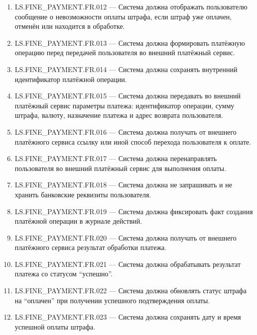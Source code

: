 \documentclass[12pt,a4paper]{article}
\begin{document}
\begin{enumerate}
		\item LS.FINE\_PAYMENT.FR.012 --- Система должна отображать пользователю сообщение о
		невозможности оплаты штрафа, если штраф уже оплачен, отменён или находится
		в обработке.
		
		\item LS.FINE\_PAYMENT.FR.013 --- Система должна формировать платёжную операцию перед
		передачей пользователя во внешний платёжный сервис.
		
		\item LS.FINE\_PAYMENT.FR.014 --- Система должна сохранять внутренний идентификатор
		платёжной операции.
		
		\item LS.FINE\_PAYMENT.FR.015 --- Система должна передавать во внешний платёжный сервис
		параметры платежа: идентификатор операции, сумму штрафа, валюту, назначение
		платежа и адрес возврата пользователя.
		
		\item LS.FINE\_PAYMENT.FR.016 --- Система должна получать от внешнего платёжного сервиса
		ссылку или иной способ перехода пользователя к оплате.
		
		\item LS.FINE\_PAYMENT.FR.017 --- Система должна перенаправлять пользователя во внешний
		платёжный сервис для выполнения оплаты.
		
		\item LS.FINE\_PAYMENT.FR.018 --- Система должна не запрашивать и не хранить банковские
		реквизиты пользователя.
		
		\item LS.FINE\_PAYMENT.FR.019 --- Система должна фиксировать факт создания платёжной
		операции в журнале действий.
		
		\item LS.FINE\_PAYMENT.FR.020 --- Система должна получать от внешнего платёжного сервиса
		результат обработки платежа.
		
		\item LS.FINE\_PAYMENT.FR.021 --- Система должна обрабатывать результат платежа со статусом
		``успешно''.
		
		\item LS.FINE\_PAYMENT.FR.022 --- Система должна обновлять статус штрафа на ``оплачен''
		при получении успешного подтверждения оплаты.
		
		\item LS.FINE\_PAYMENT.FR.023 --- Система должна сохранять дату и время успешной оплаты
		штрафа.
		

\end{enumerate}
\end{document}
